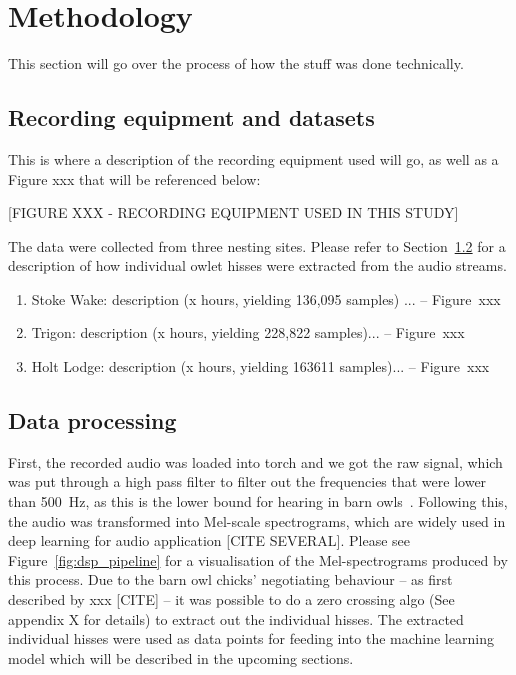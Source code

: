 \section{Methodology}
This section will go over the process of how the stuff was done technically. 

\subsection{Recording equipment and datasets}
This is where a description of the recording equipment used  will go, as well as a Figure xxx that will be referenced below:

[FIGURE XXX - RECORDING EQUIPMENT USED IN THIS STUDY]

The data were collected from three nesting sites. Please refer to Section~\ref{subsec:data_processing} for a description of how individual owlet hisses were extracted from the audio streams.  
\begin{enumerate}
  \item Stoke Wake: description (x hours, yielding 136,095 samples) ...  -- Figure~xxx
  \item Trigon: description (x hours, yielding 228,822 samples)... -- Figure~xxx
  \item Holt Lodge: description (x hours, yielding 163611 samples)... -- Figure~xxx
\end{enumerate}


\subsection{Data processing}
\label{subsec:data_processing}
First, the recorded audio was loaded into torch and we got the raw signal, which was put through a high pass filter to filter out the frequencies that were lower than \SI{500}{\hertz}, as this is the lower bound for hearing in barn owls~\cite{krummBarnOwlsHave2017}. Following this, the audio was transformed into Mel-scale spectrograms, which are widely used in deep learning for audio application [CITE SEVERAL]. Please see Figure~\ref{fig:dsp_pipeline} for a visualisation of the Mel-spectrograms produced by this process.  Due to the barn owl chicks' negotiating behaviour -- as first described by xxx [CITE] -- it was possible to  do a zero crossing algo (See appendix X for details) to extract out the individual hisses. The extracted individual hisses were used as data points for feeding into the machine learning model which will be described in the upcoming sections.

